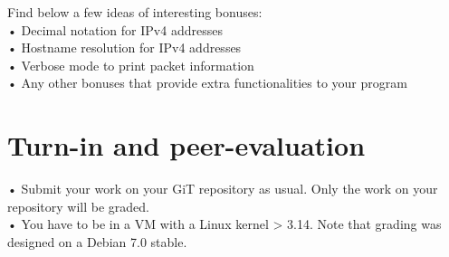 \documentclass{42-en}
\begin{document}
 Find below a few ideas of interesting bonuses:\\
 
    • Decimal notation for IPv4 addresses\\
    • Hostname resolution for IPv4 addresses\\
    • Verbose mode to print packet information\\
    • Any other bonuses that provide extra functionalities to your program\\


\chapter{Turn-in and peer-evaluation}

        • Submit your work on your GiT repository as usual. Only the work on your repository will be graded.\\
        \newline
        • You have to be in a VM with a Linux kernel > 3.14. Note that grading was designed on a Debian 7.0 stable.



\end{document}
